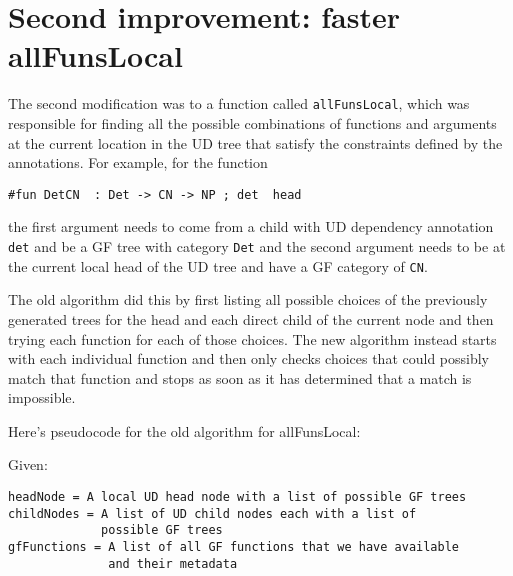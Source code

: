 

\section{Second improvement: faster allFunsLocal}

The second modification was to a function called \texttt{allFunsLocal}, which was responsible for finding all the possible combinations of functions and arguments at the current location in the UD tree that satisfy the constraints defined by the annotations. For example, for the function

\begin{verbatim}
#fun DetCN  : Det -> CN -> NP ; det  head
\end{verbatim}

the first argument needs to come from a child with UD dependency annotation \texttt{det} and be a GF tree with category \texttt{Det} and the second argument needs to be at the current local head of the UD tree and have a GF category of \texttt{CN}.

The old algorithm did this by first listing all possible choices of the previously generated trees for the head and each direct child of the current node and then trying each function for each of those choices. The new algorithm instead starts with each individual function and then only checks choices that could possibly match that function and stops as soon as it has determined that a match is impossible.

Here's pseudocode for the old algorithm for allFunsLocal:

Given:
\begin{verbatim}
headNode = A local UD head node with a list of possible GF trees
childNodes = A list of UD child nodes each with a list of
             possible GF trees
gfFunctions = A list of all GF functions that we have available
              and their metadata
\end{verbatim}


